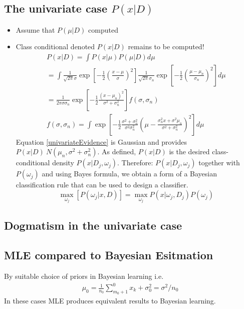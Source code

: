 \documentclass[11pt]{article}
\begin{document}
\subsection{The univariate case $P(x | D)$}
\begin{itemize}
	\item Assume that $P( \mu | D)$ computed 
	\item Class conditional denoted $P(x | D)$ remains to be computed!  
	\begin{eqnarray}
		P(x | D) =  \int P(x | \mu) P( \mu | D) d\mu \label{univariateEvidence}\\
		= \int \frac{1}{\sqrt{2\pi} \sigma} \exp [-\frac{1}{2} (\frac{x-\mu}{\sigma})^2 ] \frac{1}{\sqrt{2\pi} \sigma_n} \exp [-\frac{1}{2} (\frac{\mu - \mu_n}{\sigma_n} )^2] d\mu \\
		= \frac{1}{2\pi \sigma \sigma_n} \exp [-\frac{1}{2} \frac{(x-\mu_n)^2}{\sigma^2 + \sigma_n ^2} ] f( \sigma, \sigma _n) \\
		f( \sigma, \sigma_n) = \int \exp [ - \frac{1}{2} \frac{\sigma^2 + \sigma_n ^2} {\sigma^2 \sigma_n ^2} (\mu - \frac{\sigma_n ^2 x + \sigma^2 \mu _n}{ \sigma^2 + \sigma_n ^2}  )^2 ] d \mu
	\end{eqnarray}
	Equation \ref{univariateEvidence} is Gaussian and provides $P(x |D) ~ N(\mu_n , \sigma^2 + \sigma_n ^2)$.  As defined, $P(x |D)$ is the desired class-conditional density $P(x|D_j , \omega_j)$.  Therefore: $P(x | D_j , \omega_j)$ together with $P(\omega_j)$ and using Bayes formula, we obtain a form of a Bayesian classification rule that can be used to design a classifier. 
	\begin{equation}
		\max _{\omega_j} [P(\omega_j | x , D)] = \max _{\omega_j}  P(x | \omega_j , D_j) P(\omega_j)
	\end{equation}
	
\end{itemize}

\subsection{Dogmatism in the univariate case}
\label{problem_3_15}





\subsection{MLE compared to Bayesian Esitmation}
By suitable choice of priors in Bayesian learning i.e. 
\begin{eqnarray}
	\mu_0 = \frac{1}{n_0} \sum_{m_0 + 1}^0 x_k + \sigma^2 _0 = \sigma^2 /  n_0 
\end{eqnarray}
In these cases MLE produces equivalent results to Bayesian learning.  
\end{document}
